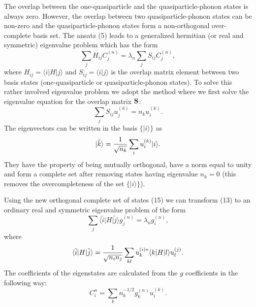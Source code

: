 The overlap between the one-quasiparticle and the
quasiparticle-phonon states is always zero. However, the overlap
between two quasiparticle-phonon states can be non-zero and the
quasiparticle-phonon states form a non-orthogonal over-complete
basis set. The ansatz (5) leads to a generalized hermitian (or real and
symmetric) eigenvalue problem which has the form \cite{TOI95}
\begin{equation}
      \sum_j H_{ij} C^{\left(n\right)}_j = \lambda_n \sum_j S_{ij}
      C^{\left(n\right)}_j,
\end{equation}
where $H_{ij}=\langle i\vert H \vert j\rangle$ and 
$S_{ij}=\langle  i\vert j\rangle$
is the overlap matrix element between two basis states (one-quasiparticle
or quasiparticle-phonon states). To solve this rather involved
eigenvalue problem we adopt the method where we first solve the
eigenvalue equation for the overlap matrix ${\bf S}$:
\begin{equation}
      \sum_j S_{ij} u^{\left(k\right)}_j = n_k u^{\left(k\right)}_i.
\end{equation}
The eigenvectors can be written in the basis
$\lbrace \vert i\rangle\rbrace$ as
\begin{equation}
      \vert \tilde{k}\rangle=
      {1\over\sqrt{n_k}}\sum_i u^{\left(k\right)}_i \vert i\rangle.
\end{equation}
They have the property of being mutually orthogonal,
have a norm equal to unity and form a complete set after removing
states having eigenvalue $n_k=0$ (this removes the overcompleteness
of the set $\lbrace \vert i\rangle\rbrace$). 

Using the new orthogonal complete set of states (15) we can
transform (13) to an ordinary real and symmetric eigenvalue problem of
the form
\begin{equation}
       \sum_j \langle \tilde{i}\vert H \vert \tilde{j}\rangle 
        g^{\left(n\right)}_j = 
       \lambda_n g^{\left(n\right)}_i,
\end{equation}
where
\begin{equation}
      \langle \tilde{i}\vert H \vert \tilde{j}\rangle = 
      {1\over\sqrt{n_i n_j}} \sum_{kl}
      u^{\left(i\right)*}_k \langle k\vert H \vert l\rangle 
      u^{\left(j\right)}_l.
\end{equation}
The coefficients of the eigenstates are calculated from the $g$ coefficients
in the following way:
\begin{equation}
      C^n_i = \sum_k n^{-1/2}_k g^{\left(n\right)}_k
      u^{\left(k\right)}_i.
\end{equation}

